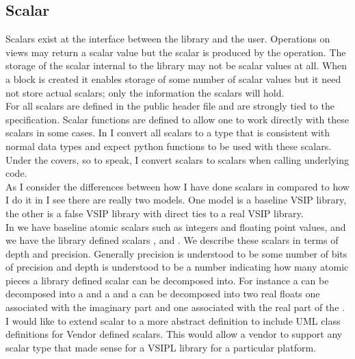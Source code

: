 \subsection{Scalar}
Scalars exist at the interface between the library and the user. Operations on views may return a scalar value but the scalar is produced by the operation.  The storage of the scalar internal to the library may not be scalar values at all.  When a block is created it enables storage of some number of scalar values but it need not store actual scalars; only the information the scalars will hold.
\\[6pt] 
For \cvl{} all scalars are defined in the public header file  and are strongly tied to the \cvl{} specification. Scalar functions are defined to allow one to work directly with these scalars in some cases.  In \pyjv{} I convert all scalars to a type that is consistent with normal  data types and expect python functions to be used with these scalars. Under the covers, so to speak, I convert \pyjv{} scalars to \cvl{} scalars when calling underlying \cvl{} code.
\\[6pt]
As I consider the differences between how I have done scalars in \pyjv{} compared to how I do it in \cvl{} I see there are really two models.  One model is a baseline VSIP library, the other is a false VSIP library with direct ties to a real VSIP library. 
\\[6pt]
In \cvl{} we have baseline atomic scalars such as integers and floating point values, and we have the library defined scalars ,  and .  We describe these scalars in terms of depth and precision. Generally precision is understood to be some number of bits of precision and depth is understood to be a number indicating how many atomic pieces a library defined scalar can be decomposed into. For instance a  can be decomposed into a  and a  and a  can be decomposed into two real floats one associated with the imaginary part  and one associated with the real part of the .
\\[6pt]
I would like to extend scalar to a more abstract definition to include UML class definitions for Vendor defined scalars. This would allow a vendor to support any scalar type that made sense for a VSIPL library for a particular platform.
